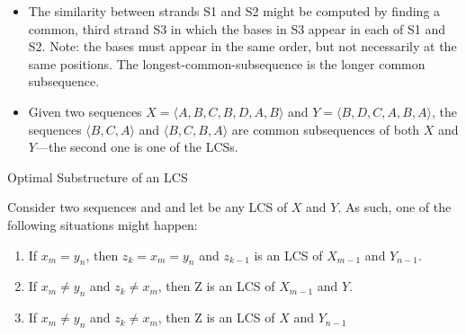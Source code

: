 \begin{frame}
  
\begin{itemize}
\item The similarity between strands S1 and S2 might be
  computed by finding a common, third strand S3 in which the bases in S3 appear
  in each of S1 and S2. Note: the bases must appear  in the same order,
  but not necessarily at the same positions. The longest-common-subsequence is the
  longer common subsequence.

  \pause
  
\item Given two sequences $X = \langle A, B, C, B, D, A, B \rangle$ and
  $Y = \langle B, D, C, A, B, A \rangle$, the sequences $\langle B, C, A \rangle$ and
  $\langle B, C, B, A \rangle$ are common subsequences of both $X$ and $Y$\pause---the
  second one is one of the LCSs. 
\end{itemize}


\end{frame}

\begin{frame}{Optimal Substructure of an LCS}

  Consider two sequences  and  and
  let  be any LCS of $X$ and $Y$. As such, one of the following
  situations might happen:

  \begin{small}
  \begin{enumerate}
    \item If $x_m = y_n$, then $z_k = x_m = y_n$ and $z_{k-1}$ is an LCS of $X_{m-1}$ and $Y_{n-1}$.
    \item If $x_m \neq y_n$ and $z_k \neq x_m$, then Z is an LCS of $X_{m-1}$ and $Y$.
    \item If $x_m \neq y_n$ and $z_k \neq x_m$, then Z is an LCS of $X$ and $Y_{n-1}$  
  \end{enumerate}
  \end{small}
\end{frame}

